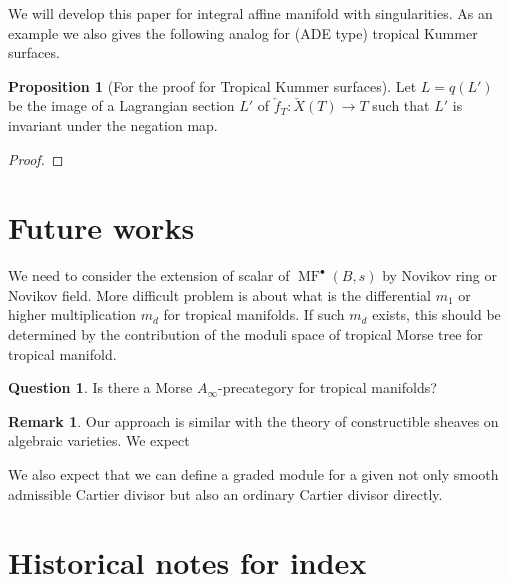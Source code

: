 \documentclass[a4paper,dvipdfmx,reqno,12pt]{amsart}
\theoremstyle{definition}
\newtheorem{Prop}[Thm]{Proposition}
\newtheorem{Ques}[Thm]{Question}
\newtheorem{Rmk}[Thm]{Remark}
\newcommand{\opn}[1]{\operatorname{#1}}
\numberwithin{equation}{section}
\begin{document}
We will develop this paper for integral affine manifold
with singularities. As an example we also gives the 
following analog for (ADE type) tropical Kummer surfaces.

\begin{Prop}[{For the proof for Tropical Kummer surfaces}]
Let $L=q(L')$ be the image of a Lagrangian 
section $L'$ of $\check{f}_{T}\colon \check{X}(T)\to T$ such 
that $L'$ is invariant under the negation map. 
\end{Prop}
\begin{proof}

\end{proof}


\section{Future works}
We need to consider the extension of scalar of 
$\opn{MF}^{\bullet}(B,s)$ by 
Novikov ring or Novikov field.
More difficult problem is about what is the differential $m_1$ or higher multiplication $m_d$ for tropical manifolds.
If such $m_d$ exists, this should be determined by the contribution of the moduli space of tropical Morse tree for tropical manifold.
\begin{Ques}
  Is there a Morse $A_{\infty}$-precategory for tropical manifolds?
\end{Ques}

\begin{Rmk}
Our approach is similar with the theory of constructible sheaves 
on algebraic varieties.
We expect
\end{Rmk}

We also expect that we can define a graded module for a given
not only smooth admissible Cartier divisor but also 
an ordinary Cartier divisor directly.



\appendix

\section{Historical notes for index}
\end{document}
